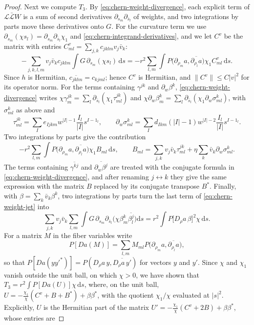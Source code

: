 \begin{proof}
Next we compute $T_3$. By \eqref{eq:chern-weight-divergence}, each explicit term of $\mathcal L\bar{\mathcal L}W$ is a sum of second derivatives $\partial_{s_m}\partial_{\bar s_l}$ of weights, and two integrations by parts move these derivatives onto $G$. For the curvature term we use $\partial_{s_m}(\chi s_l)=\partial_{s_m}\partial_{\bar s_l}\chi_1$ and \eqref{eq:chern-integrand-derivatives}, and we let $C^v$ be the matrix with entries $C^v_{ml}=\sum_{j,k}c_{jklm}v_j\bar v_k$:
\[
 -\sum_{j,k,l,m}v_j\bar v_kc_{jklm}\int G\,\partial_{s_m}(\chi s_l)\,\mathrm ds=-r^2\sum_{l,m}\int P\bigl(\partial_{\rho_m}a,\overline{\partial_{\rho_l}a}\bigr)\chi_1C^v_{ml}\,\mathrm ds.
\]
Since $h$ is Hermitian, $\overline{c_{jklm}}=c_{kjml}$; hence $C^v$ is Hermitian, and $\|C^v\|\leq C|v|^2$ for its operator norm. For the terms containing $\gamma^{jk}$ and $\partial_w\beta^k$, \eqref{eq:chern-weight-divergence} writes $\chi\gamma^{jk}_m=\sum_l\partial_{\bar s_l}(\chi_1\tau^{jk}_{ml})$ and $\chi\partial_w\beta^k_m=\sum_l\partial_{\bar s_l}(\chi_1\partial_w\sigma^k_{ml})$, with $\sigma^k_{ml}$ as above and
\[
 \tau^{jk}_{ml}=\sum_Ie_{Ijkm}w^{|I|-1}\frac{I_l}{|I|}s^{I-1_l},\qquad \partial_w\sigma^k_{ml}=\sum_Id_{Ikm}(|I|-1)w^{|I|-2}\frac{I_l}{|I|}s^{I-1_l}.
\]
Two integrations by parts give the contribution
\[
 -r^2\sum_{l,m}\int P\bigl(\partial_{\rho_m}a,\overline{\partial_{\rho_l}a}\bigr)\chi_1B_{ml}\,\mathrm ds,\qquad B_{ml}=\sum_{j,k}v_j\bar v_k\tau^{jk}_{ml}+\eta\sum_k\bar v_k\partial_w\sigma^k_{ml}.
\]
The terms containing $\overline{\gamma^{kj}}$ and $\overline{\partial_w\beta^j}$ are treated with the conjugate formula in \eqref{eq:chern-weight-divergence}, and after renaming $j\leftrightarrow k$ they give the same expression with the matrix $B$ replaced by its conjugate transpose $B^*$. Finally, with $\beta=\sum_k\bar v_k\beta^k$, two integrations by parts turn the last term of \eqref{eq:chern-weight-jet} into
\[
 \sum_{j,k}v_j\bar v_k\sum_{l,m}\int G\,\partial_{s_m}\partial_{\bar s_l}\bigl(\chi\beta^k_m\overline{\beta^j_l}\bigr)\mathrm ds
 =r^2\int P\bigl[D_\rho a\,\beta\bigr]^2\chi\,\mathrm ds.
\]
For a matrix $M$ in the fiber variables write
\[
 P[Da(M)]=\sum_{l,m}M_{ml}P\bigl(\partial_{\rho_m}a,\overline{\partial_{\rho_l}a}\bigr),
\]
so that $P[Da(yy'^*)]=P(D_\rho a\,y,\overline{D_\rho a\,y'})$ for vectors $y$ and $y'$. Since $\chi$ and $\chi_1$ vanish outside the unit ball, on which $\chi>0$, we have shown that $T_3=r^2\int P[Da(U)]\chi\,\mathrm ds$, where, on the unit ball, $U=-\frac{\chi_1}{\chi}(C^v+B+B^*)+\beta\beta^*$, with the quotient $\chi_1/\chi$ evaluated at $|s|^2$. Explicitly, $U$ is the Hermitian part of the matrix $U'=-\frac{\chi_1}{\chi}(C^v+2B)+\beta\beta^*$, whose entries are

\end{proof}
